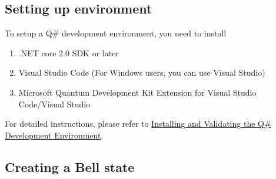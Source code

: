 \subsection{Setting up environment}
To setup a Q\# development environment, you need to install
\begin{enumerate}
  \item .NET core 2.0 SDK or later
  \item Visual Studio Code (For Windows users, you can use Visual Studio)
  \item Microsoft Quantum Development Kit Extension for Visual Studio Code/Visual Studio
\end{enumerate}
For detailed instructions, please refer to
\href{https://docs.microsoft.com/en-us/quantum/quantum-installconfig?view=qsharp-preview&tabs=tabid-vscode}{Installing and Validating the Q\# Development Environment}\cite{Chapter1-setup-environment}.

\subsection{Creating a Bell state}
